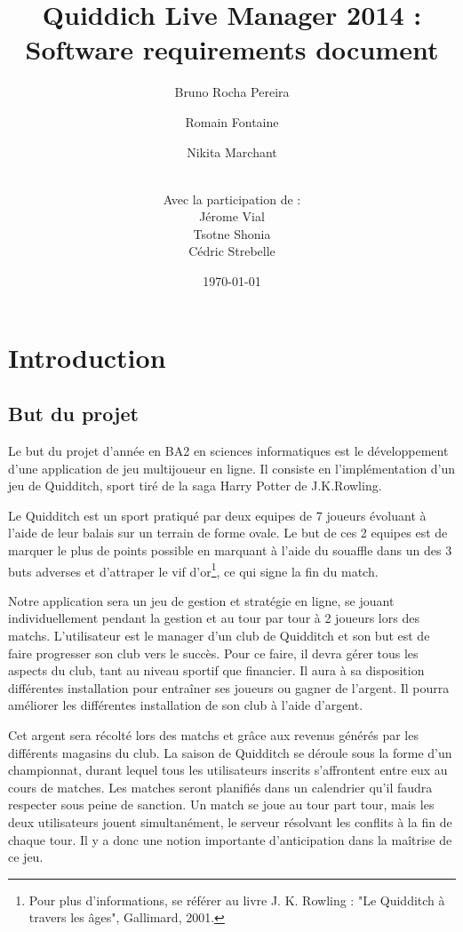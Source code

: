 \documentclass[a4paper]{report}
\title{Quiddich Live Manager 2014 : \\Software requirements document}
\author{Bruno Rocha Pereira \and Romain Fontaine \and Nikita Marchant \and
 \\Avec la participation de : \\ Jérome Vial \\ Tsotne Shonia \\ Cédric Strebelle }
\date{\today}
\begin{document}

\maketitle
\tableofcontents
\clearpage


\chapter{Introduction}
\section{But du projet}
Le but du projet d'année en BA2 en sciences informatiques est le développement d'une application de jeu multijoueur en ligne.
Il consiste en l'implémentation d'un jeu de Quidditch, sport tiré de la saga Harry Potter de J.K.Rowling.


Le Quidditch est un sport pratiqué par deux \glspl{equipe} de 7 \glspl{joueur} évoluant à l'aide de leur balais sur un terrain de forme ovale. Le but de ces 2 \glspl{equipe} est de marquer le plus de points possible en marquant à l'aide du souaffle dans un des 3 buts adverses et d'attraper le vif d'or\footnote{Pour plus d'informations, se référer au livre J. K. Rowling : "Le Quidditch à travers les âges", Gallimard, 2001.}, ce qui signe la fin du match. 


Notre application sera un jeu de gestion et stratégie en ligne, se jouant individuellement pendant la gestion et au tour par tour à 2 joueurs lors des matchs. L'\gls{utilisateur} est le \gls{manager} d'un \gls{club} de Quidditch et son but est de faire progresser son \gls{club} vers le succès. Pour ce faire, il devra gérer tous les aspects du \gls{club}, tant au niveau sportif que financier. Il aura à sa disposition différentes installation pour entraîner ses \glspl{joueur} ou gagner de l'argent. Il pourra améliorer les différentes installation de son \gls{club} à l'aide d'argent.

Cet argent sera récolté lors des matchs et grâce aux revenus générés par les différents magasins du \gls{club}. La saison de Quidditch se déroule sous la forme d'un championnat, durant lequel tous les \glspl{utilisateur} inscrits s'affrontent entre eux au cours de matches. Les matches seront planifiés dans un calendrier qu'il faudra respecter sous peine de sanction. Un match se joue au tour part tour, mais les deux \glspl{utilisateur} jouent simultanément, le \gls{serveur} résolvant les conflits à la fin de chaque tour. Il y a donc une notion importante d'anticipation dans la maîtrise de ce jeu.
\end{document}
